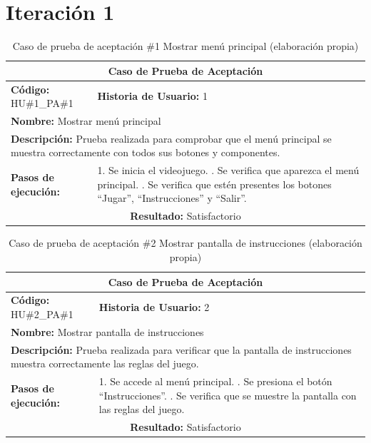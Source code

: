 \section*{Iteración 1}

\begin{table}[H]
\centering
\caption{Caso de prueba de aceptación \#1 Mostrar menú principal (elaboración propia)\label{tab:cpa1}}
\renewcommand{\arraystretch}{1.3}
\begin{tabular}{|p{}|p{}|}
\hline
\multicolumn{2}{|c|}{\textbf{Caso de Prueba de Aceptación}} \\
\hline
\textbf{Código:} HU\#1\_PA\#1 & \textbf{Historia de Usuario:} 1 \\
\hline
\multicolumn{2}{|l|}{\textbf{Nombre:} Mostrar menú principal} \\
\hline
\multicolumn{2}{|p{0.9\textwidth}|}{\textbf{Descripción:} Prueba realizada para comprobar que el menú principal se muestra correctamente con todos sus botones y componentes.} \\
\hline
\textbf{Pasos de ejecución:} & 1. Se inicia el videojuego. \newline 2. Se verifica que aparezca el menú principal. \newline 3. Se verifica que estén presentes los botones ``Jugar'', ``Instrucciones'' y ``Salir''. \\
\hline
\multicolumn{2}{|c|}{\textbf{Resultado:} Satisfactorio} \\
\hline
\end{tabular}
\end{table}

\begin{table}[H]
\centering
\caption{Caso de prueba de aceptación \#2 Mostrar pantalla de instrucciones (elaboración propia)\label{tab:cpa2}}
\renewcommand{\arraystretch}{1.3}
\begin{tabular}{|p{}|p{}|}
\hline
\multicolumn{2}{|c|}{\textbf{Caso de Prueba de Aceptación}} \\
\hline
\textbf{Código:} HU\#2\_PA\#1 & \textbf{Historia de Usuario:} 2 \\
\hline
\multicolumn{2}{|l|}{\textbf{Nombre:} Mostrar pantalla de instrucciones} \\
\hline
\multicolumn{2}{|p{0.9\textwidth}|}{\textbf{Descripción:} Prueba realizada para verificar que la pantalla de instrucciones muestra correctamente las reglas del juego.} \\
\hline
\textbf{Pasos de ejecución:} & 1. Se accede al menú principal. \newline 2. Se presiona el botón ``Instrucciones''. \newline 3. Se verifica que se muestre la pantalla con las reglas del juego. \\
\hline
\multicolumn{2}{|c|}{\textbf{Resultado:} Satisfactorio} \\
\hline
\end{tabular}
\end{table}

